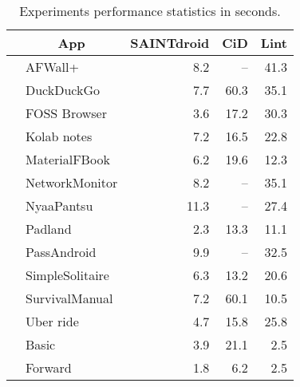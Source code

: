 

\begin{table}%
\centering
\caption {\label{tab:tab-timing-results} Experiments performance statistics in seconds.}
\begin{tabular}{c|l|r|r|r}
\toprule
& \multicolumn{1}{c|}{App}      & {\sc SAINTdroid}  & {\sc CiD}     & {\sc Lint} \\
\midrule
\parbox[t]{5mm}{}
& AFWall+         & 8.2  & -- %
& 41.3 \\
& DuckDuckGo      & 7.7  & 60.3     & 35.1 \\
& FOSS Browser    & 3.6  & 17.2     & 30.3 \\
& Kolab notes     & 7.2  & 16.5     & 22.8 \\
& MaterialFBook   & 6.2  & 19.6     & 12.3 \\
& NetworkMonitor  & 8.2  & -- %
& 35.1 \\
& NyaaPantsu      & 11.3 & -- %
& 27.4 \\
& Padland         & 2.3  & 13.3     & 11.1 \\
& PassAndroid     & 9.9  & -- %
& 32.5 \\
& SimpleSolitaire & 6.3  & 13.2     & 20.6 \\
& SurvivalManual  & 7.2  & 60.1     & 10.5 \\
& Uber ride       & 4.7  & 15.8     & 25.8 \\
\midrule
\parbox[t]{5mm}{}
& Basic       & 3.9  & 21.1 & 2.5 \\
& Forward     & 1.8  & 6.2  & 2.5 \\

\end{tabular}
\end{table}
